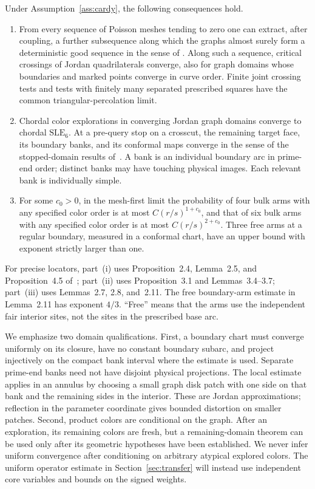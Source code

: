 \begin{proposition}\label{in:limits}
Under Assumption~\ref{ass:cardy}, the following consequences hold.
\begin{enumerate}[label=\textup{(\roman*)}]
\item From every sequence of Poisson meshes tending to zero one can
extract, after coupling, a further subsequence along which the graphs
almost surely form a deterministic good sequence in the sense of
\cite[Lemma~2.5]{V}. Along such a sequence, critical crossings of
Jordan quadrilaterals converge, also for graph domains whose boundaries
and marked points converge in curve order. Finite joint crossing tests
and tests with finitely many separated prescribed squares have the
common triangular-percolation limit.
\item Chordal color explorations in converging Jordan graph domains
converge to chordal $\mathrm{SLE}_6$. At a pre-query stop on a
crosscut, the remaining target face, its boundary banks, and its
conformal maps converge in the sense of the stopped-domain results
of~\cite{V}. A bank is an individual boundary arc in prime-end order;
distinct banks may have touching physical images. Each relevant bank
is individually simple.
\item For some $c_0>0$, in the mesh-first limit the probability of
four bulk arms with any specified color order is at most
$C(r/s)^{1+c_0}$, and that of six bulk arms with any specified color
order is at most $C(r/s)^{2+c_0}$. Three free arms at a regular
boundary, measured in a conformal chart, have an upper bound with
exponent strictly larger than one.
\end{enumerate}
\end{proposition}

For precise locators, part~(i) uses Proposition~2.4, Lemma~2.5, and
Proposition~4.5 of~\cite{V}; part~(ii) uses Proposition~3.1 and
Lemmas~3.4--3.7; part~(iii) uses Lemmas~2.7, 2.8, and~2.11.
The free boundary-arm estimate in Lemma~2.11 has exponent $4/3$.
``Free'' means that the arms use the independent fair interior sites,
not the sites in the prescribed base arc.

We emphasize two domain qualifications. First, a boundary chart must
converge uniformly on its closure, have no constant boundary subarc,
and project injectively on the compact bank interval where the
estimate is used. Separate prime-end banks need not have disjoint
physical projections. The local estimate applies in an annulus by
choosing a small graph disk patch with one side on that bank and the
remaining sides in the interior. These are Jordan approximations;
reflection in the parameter coordinate gives bounded distortion on
smaller patches. Second, product colors are conditional on the graph.
After an exploration, its remaining colors are fresh, but a
remaining-domain theorem can be used only after its geometric
hypotheses have been established. We never infer uniform convergence
after conditioning on arbitrary atypical explored colors. The uniform
operator estimate in Section~\ref{sec:transfer} will instead use
independent core variables and bounds on the signed weights.

